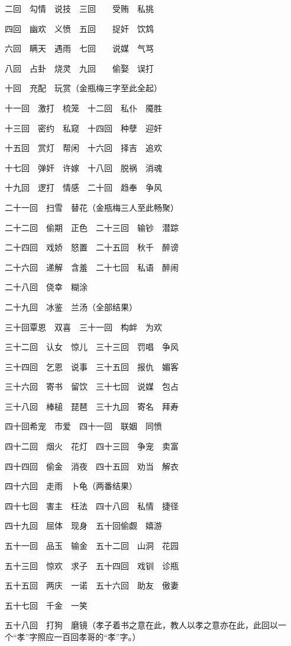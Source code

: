 \begin{showcontents}{}
{二回　勾情　说技　三回　　受贿　私挑

四回　幽欢　义愤　五回　　捉奸　饮鸩

六回　瞒天　遇雨　七回　　说媒　气骂

八回　占卦　烧灵　九回　　偷娶　误打

十回　充配　玩赏（金瓶梅三字至此全起）

十一回　激打　梳笼　十二回　私仆　魇胜

十三回　密约　私窥　十四回　种孽　迎奸

十五回　赏灯　帮闲　十六回　择吉　追欢

十七回　弹奸　许嫁　十八回　脱祸　消魂

十九回　逻打　情感　二十回　趋奉　争风

二十一回　扫雪　替花（金瓶梅三人至此畅聚）

二十二回　偷期　正色　二十三回　输钞　潜踪

二十四回　戏娇　怒置　二十五回　秋千　醉谤

二十六回　递解　含羞　二十七回　私语　醉闹

二十八回　侥幸　糊涂

二十九回　冰鉴　兰汤（全部结果）

三十回覃恩　双喜　三十一回　构衅　为欢

三十二回　认女　惊儿　三十三回　罚唱　争风

三十四回　乞恩　说事　三十五回　报仇　媚客

三十六回　寄书　留饮　三十七回　说媒　包占

三十八回　棒槌　琵琶　三十九回　寄名　拜寿

四十回希宠　市爱　四十一回　联姻　同愤

四十二回　烟火　花灯　四十三回　争宠　卖富

四十四回　偷金　消夜　四十五回　劝当　解衣

四十六回　走雨　卜龟（两番结果）

四十七回　害主　枉法　四十八回　私情　捷径

四十九回　屈体　现身　五十回偷觑　嬉游

五十一回　品玉　输金　五十二回　山洞　花园

五十三回　惊欢　求子　五十四回　戏钏　诊瓶

五十五回　两庆　一诺　五十六回　助友　傲妻

五十七回　千金　一笑

五十八回　打狗　磨镜（孝子着书之意在此，教人以孝之意亦在此，此回以一个“孝”字照应一百回孝哥的“孝”字。）

}
\end{showcontents}
